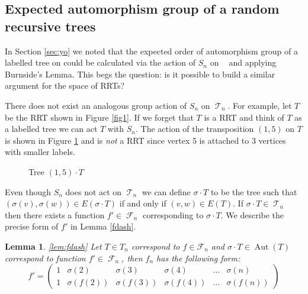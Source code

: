 \documentclass[oneside]{book} %
\newtheorem{lem}[thm]{Lemma}
\theoremstyle{definition}
\numberwithin{equation}{section}
\DeclareMathOperator{\Aut}{Aut} %
\DeclareMathOperator{\T}{\mathcal{T}}
\DeclareMathOperator{\lT}{\tilde{\mathcal{T}}_n}
\DeclareMathOperator{\F}{\mathcal{F}}
\begin{document}


\subsection{Expected automorphism group of a random recursive trees}
In Section \ref{sec:yo} we noted that the expected order of automorphism group of a labelled tree on could be calculated via
the action of $S_n$ on $\lT$ and applying Burnside's Lemma.  This begs the question: is it possible to build a similar argument for the space of RRTs? 

There does not exist an analogous group action of $S_n$ on $\T_n$. For example, let $T$ be the RRT shown in Figure \ref{fig1}.
If we forget that $T$ is a RRT and think of $T$ as a labelled tree we can act $T$ with $S_n$.  The action of the 
transposition $(1,5)$ on $T$ is shown in Figure \ref{fig3} and is \emph{not} a RRT since vertex 5 is attached to 3 vertices with smaller labels. 

\begin{figure}[ht]
\centering
{}
\caption{Tree $(1,5) \cdot T$}\label{fig3}
\end{figure}

Even though $S_n$ does not act on $\T_n$ we can define $\sigma \cdot T$ to be the tree such that $(\sigma(v),\sigma(w)) \in E(\sigma \cdot T)$ if and only if $(v,w) \in E(T)$.  If $\sigma \cdot T \in \T_n$ then there exists a function $f' \in \F_n$ corresponding to $\sigma \cdot T$.  We describe the precise form of $f'$ in Lemma \ref{fdash}. 

\begin{lem}\ref{lem:fdash}
Let $T \in T_n$ correspond to $f \in \mathcal{F}_n$ and  $\sigma \cdot T \in \Aut(T)$ correspond to function $f' \in \F_n$, then $f_n$ has the following form:  
\[ f'= \left(\begin{array}{cccccc}
     1& \sigma(2)&\sigma(3) &\sigma(4)& \dots & \sigma(n) \\
     1 & \sigma(f(2)) &\sigma(f(3)) &\sigma(f(4)) &\dots & \sigma(f(n))
    \end{array} \right)
\]
\end{lem}
\end{document}
